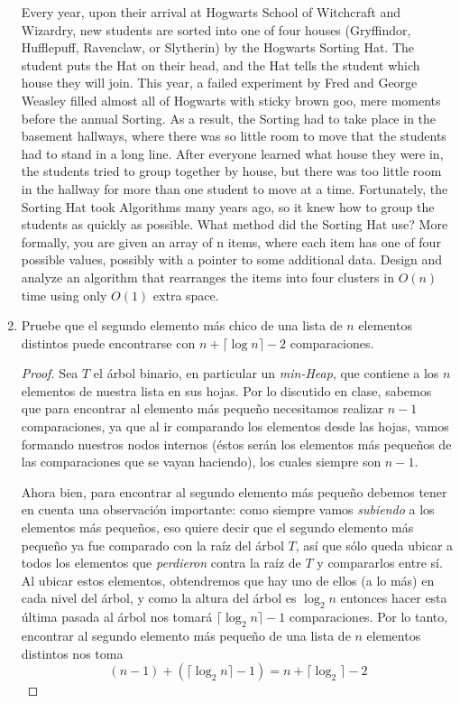 \documentclass[letterpaper,11pt]{article}
\begin{document}
\begin{enumerate}
    Every year, upon their arrival at Hogwarts School of Witchcraft and Wizardry, 
    new students are sorted into one of four houses (Gryffindor, Hufflepuff, 
    Ravenclaw, or Slytherin) by the Hogwarts Sorting Hat. The student puts the 
    Hat on their head, and the Hat tells the student which house they will join. 
    This year, a failed experiment by Fred and George Weasley filled almost all 
    of Hogwarts with sticky brown goo, mere moments before the annual Sorting. 
    As a result, the Sorting had to take place in the basement hallways, where 
    there was so little room to move that the students had to stand in a long 
    line. After everyone learned what house they were in, the students tried to 
    group together by house, but there was too little room in the hallway for 
    more than one student to move at a time. Fortunately, the Sorting Hat took 
    Algorithms many years ago, so it knew how to group the students as quickly 
    as possible. What method did the Sorting Hat use? More formally, you are 
    given an array of n items, where each item has one of four possible values, 
    possibly with a pointer to some additional data. Design and analyze an 
    algorithm that rearranges the items into four clusters in $O(n)$ time 
    using only $O(1)$ extra space.

    \newpage
    \item Pruebe que el segundo elemento más chico de una lista de $n$ elementos 
    distintos puede encontrarse con $n + \lceil \log n \rceil - 2$ comparaciones.

    \begin{proof}
        Sea $T$ el árbol binario, en particular un \textit{min-Heap}, que 
        contiene a los $n$ elementos de nuestra lista en sus hojas. Por lo 
        discutido en clase, sabemos que para encontrar al elemento más pequeño 
        necesitamos realizar $n-1$ comparaciones, ya que al ir comparando los 
        elementos desde las hojas, vamos formando nuestros nodos internos (éstos 
        serán los elementos más pequeños de las comparaciones que se vayan 
        haciendo), los cuales siempre son $n-1$.

        Ahora bien, para encontrar al segundo elemento más pequeño debemos
        tener en cuenta una observación importante: como siempre vamos 
        \textit{subiendo} a los elementos más pequeños, eso quiere decir que el 
        segundo elemento más pequeño ya fue comparado con la raíz del árbol $T$,
        así que sólo queda ubicar a todos los elementos que \textit{perdieron}
        contra la raíz de $T$ y compararlos entre sí. Al ubicar estos elementos, 
        obtendremos que hay uno de ellos (a lo más) en cada nivel del árbol, y 
        como la altura del árbol es $\log_2 n$ entonces hacer esta última 
        pasada al árbol nos tomará $\lceil \log_2 n \rceil - 1$ comparaciones.
        Por lo tanto, encontrar al segundo elemento más pequeño de una lista de 
        $n$ elementos distintos nos toma 
        \begin{equation*}
            (n - 1) + (\lceil \log_2 n \rceil - 1) = n + \lceil \log_2 \rceil - 2
        \end{equation*}


\end{proof}
\end{enumerate}
\end{document}
